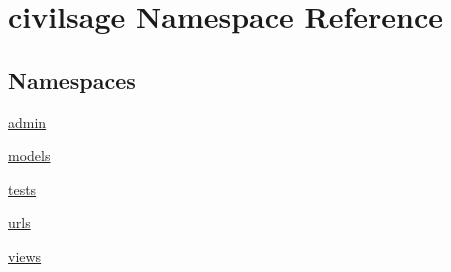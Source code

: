 \hypertarget{a00031}{}\section{civilsage Namespace Reference}
\label{a00031}
\subsection*{Namespaces}
\begin{DoxyCompactItemize}
\item 
 \hyperlink{a00032}{admin}
\item 
 \hyperlink{a00033}{models}
\item 
 \hyperlink{a00034}{tests}
\item 
 \hyperlink{a00035}{urls}
\item 
 \hyperlink{a00036}{views}
\end{DoxyCompactItemize}
